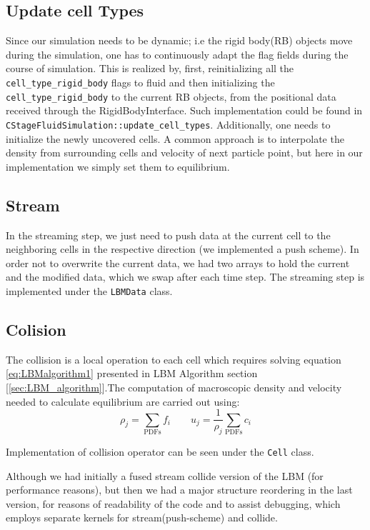 \subsection *{Update cell Types}
Since our simulation needs to be dynamic; i.e the rigid body(RB) objects move during
the simulation, one has to continuously adapt the flag fields during the course of simulation. This is realized by, first, reinitializing all the \texttt {cell_type_rigid_body} flags to fluid and then initializing the \texttt{cell_type_rigid_body} to the current RB objects, from the positional data
received through the RigidBodyInterface. Such implementation could be found in \texttt{CStageFluidSimulation::update_cell_types}. Additionally, one needs to initialize the newly uncovered cells. A common approach is to interpolate the density from surrounding cells and velocity of next particle point, but here in our implementation we simply set them to equilibrium.
\subsection *{Stream}
 In the streaming step, we just need to push data at the current cell to the neighboring cells in the respective direction (we implemented a push scheme). In order not
 to overwrite the current data, we had two arrays to hold the current and the 
 modified data, which we swap after each time step. The streaming step is implemented under the \texttt{LBMData} class. 
 
 \subsection *{Colision} \label{subsection:collision}
 The collision is a local operation to each cell  which requires solving equation \ref{eq:LBMalgorithm1} presented in LBM Algorithm section [\ref{sec:LBM_algorithm}].The computation of macroscopic density and velocity needed to calculate equilibrium are carried out using:
 \[\rho_j = \sum_{\mathrm{PDFs}} f_i\qquad u_j = \frac{1}{\rho_j} \sum_\mathrm{PDFs}
 c_i\]
 
  Implementation of collision operator can be seen under the \texttt{Cell} class.
 
 
 Although we had initially a fused stream collide version of the LBM (for performance reasons), but then we had a major structure reordering in the last version, for reasons of readability of the code and to assist debugging, which employs separate kernels for stream(push-scheme) and collide.
 
